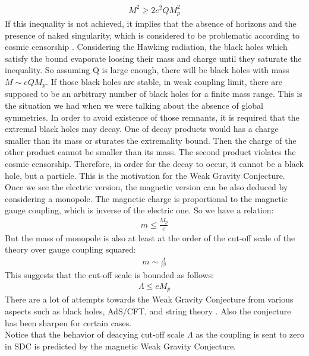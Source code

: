 \begin{align}
    M^{2} \geq 2e^{2} QM_{p}^{2}
\end{align}
If this inequality is not achieved, it implies that the absence of horizons and the presence of naked singularity, which is considered to be problematic according to cosmic censorship \parencite{penrose_golden_2002}. Considering the Hawking radiation, the black holes which satisfy the bound evaporate loosing their mass and charge until they saturate the inequality. So assuming Q is large enough, there will be black holes with mass $M \sim eQM_{p}$. If those black holes are stable, in weak coupling limit, there are supposed to be an arbitrary number of black holes for a finite mass range. This is the situation we had when we were talking about the absence of global symmetries. In order to avoid existence of those remnants, it is required that the extremal black holes may decay. One of decay products would has a charge smaller than its mass or sturates the extremality bound. Then the charge of the other product cannot be smaller than its mass. The second product violates the cosmic censorship. Therefore, in order for the decay to occur, it cannot be a black hole, but a particle. This is the motivation for the Weak Gravity Conjecture. Once we see the electric version, the magnetic version can be also deduced by considering a monopole. The magnetic charge is proportional to the magnetic gauge coupling, which is inverse of the electric one. So we have a relation:
\begin{align}
    m \leq \frac{M_{p}}{e}
\end{align}
But the mass of monopole is also at least at the order of the cut-off scale of the theory over gauge coupling squared:
\begin{align}
    m \sim \frac{\Lambda}{e^{2}}
\end{align}
This suggests that the cut-off scale is bounded as follows:
\begin{align}
    \Lambda \le eM_{p}
\end{align}
There are a lot of attempts towards the Weak Gravity Conjecture from various aspects such as black holes, AdS/CFT, and string theory \parencite{montero_weak_2016,hod_proof_2017,crisford_testing_2018, cheung_proof_2018, hamada_weak_2019,andriolo_tower_2018-1}. Also the conjecture has been sharpen for certain cases. \\
\indent Notice that the behavior of deacying cut-off scale $\Lambda$ as the coupling is sent to zero in SDC is predicted by the magnetic Weak Gravity Conjecture.